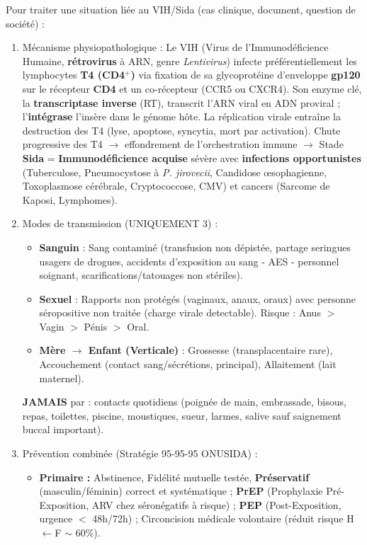 \documentclass[11pt]{article}
\newcommand{\cle}[1]{{\popxbold\color{popdark}#1}}
\begin{document}
\begin{methode}
Pour traiter une situation liée au VIH/Sida (cas clinique, document, question de société) :
\begin{enumerate}
\item \cle{Mécanisme physiopathologique} : Le VIH (Virus de l'Immunodéficience Humaine, \textbf{rétrovirus} à ARN, genre \emph{Lentivirus}) infecte préférentiellement les lymphocytes \textbf{T4 (CD4$^{+}$)} via fixation de sa glycoprotéine d'enveloppe \textbf{gp120} sur le récepteur \textbf{CD4} et un co-récepteur (CCR5 ou CXCR4). Son enzyme clé, la \textbf{transcriptase inverse} (RT), transcrit l'ARN viral en ADN proviral ; l'\textbf{intégrase} l'insère dans le génome hôte. La réplication virale entraîne la destruction des T4 (lyse, apoptose, syncytia, mort par activation). Chute progressive des T4 $\rightarrow$ effondrement de l'orchestration immune $\rightarrow$ Stade \textbf{Sida} = \textbf{Immunodéficience acquise} sévère avec \textbf{infections opportunistes} (Tuberculose, Pneumocystose à \emph{P. jirovecii}, Candidose œsophagienne, Toxoplasmose cérébrale, Cryptococcose, CMV) et cancers (Sarcome de Kaposi, Lymphomes).
\item \cle{Modes de transmission (UNIQUEMENT 3)} : 
\begin{itemize}
\item \textbf{Sanguin} : Sang contaminé (transfusion non dépistée, partage seringues usagers de drogues, accidents d'exposition au sang - AES - personnel soignant, scarifications/tatouages non stériles).
\item \textbf{Sexuel} : Rapports non protégés (vaginaux, anaux, oraux) avec personne séropositive non traitée (charge virale detectable). Risque : Anus $>$ Vagin $>$ Pénis $>$ Oral.
\item \textbf{Mère $\rightarrow$ Enfant (Verticale)} : Grossesse (transplacentaire rare), Accouchement (contact sang/sécrétions, principal), Allaitement (lait maternel).
\end{itemize}
\textbf{JAMAIS} par : contacts quotidiens (poignée de main, embrassade, bisous, repas, toilettes, piscine, moustiques, sueur, larmes, salive sauf saignement buccal important).
\item \cle{Prévention combinée (Stratégie 95-95-95 ONUSIDA)} :
\begin{itemize}
\item \textbf{Primaire :} Abstinence, Fidélité mutuelle testée, \textbf{Préservatif} (masculin/féminin) correct et systématique ; \textbf{PrEP} (Prophylaxie Pré-Exposition, ARV chez séronégatifs à risque) ; \textbf{PEP} (Post-Exposition, urgence $<$ 48h/72h) ; Circoncision médicale volontaire (réduit risque H$\leftarrow$F $\sim$ 60\%).

\end{itemize}
\end{enumerate}
\end{methode}
\end{document}
